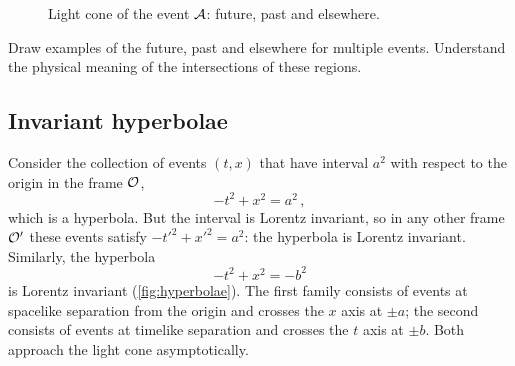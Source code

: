 \begin{figure}[H]
    \centering
    \caption{Light cone of the event $\mathcal{A}$: future, past and elsewhere.}
    \label{fig:lightcone}
\end{figure}

\begin{exercise}
    Draw examples of the future, past and elsewhere for multiple events. Understand the physical
    meaning of the intersections of these regions.
\end{exercise}


\subsection{Invariant hyperbolae}
\label{sec:sr_hyperbolae}

Consider the collection of events $(t, x)$ that have interval $a^2$ with respect to the origin in
the frame $\mathcal{O}$,
\begin{equation}
    -t^2 + x^2 = a^2 \, ,
    \label{eq:hyperbola_spacelike}
\end{equation}
which is a hyperbola. But the interval is Lorentz invariant, so in any other frame $\mathcal{O}'$ these
events satisfy $-t'^2 + x'^2 = a^2$: the hyperbola is Lorentz invariant. Similarly, the hyperbola
\begin{equation}
    -t^2 + x^2 = -b^2
    \label{eq:hyperbola_timelike}
\end{equation}
is Lorentz invariant (\cref{fig:hyperbolae}). The first family consists of events at spacelike
separation from the origin and crosses the $x$ axis at $\pm a$; the second consists of events at
timelike separation and crosses the $t$ axis at $\pm b$. Both approach the light cone
asymptotically.

